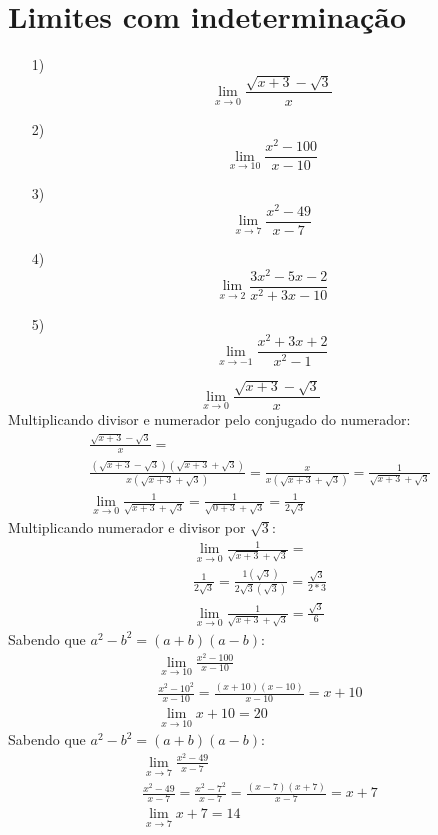 \documentclass{jhwhw}
\begin{document}
\chapter{Limites com indeterminação}
\begin{enumerate}
    \item [1)] \[
              \lim_{x \to 0} \frac{\sqrt{x+3}-\sqrt{3}}{x}
          \]
    \item [2)] \[
              \lim_{x \to 10} \frac{x^2-100}{x-10}
          \]
    \item [3)] \[
              \lim_{x \to 7} \frac{x^2-49}{x-7}
          \]
    \item [4)] \[
              \lim_{x \to 2} \frac{3x^2-5x-2}{x^2+3x-10}
          \]
    \item [5)] \[
              \lim_{x \to -1} \frac{x^2+3x+2}{x^2-1}
          \]
\end{enumerate}
\newpage
{}
$$\lim_{x \to 0} \frac{\sqrt{x+3}-\sqrt{3}}{x}$$
Multiplicando divisor e numerador pelo conjugado do numerador:
\begin{multline*}
    \frac{\sqrt{x+3}-\sqrt{3}}{x} =\\ \frac{(\sqrt{x+3}-\sqrt{3})(\sqrt{x+3}+\sqrt{3})}{x(\sqrt{x+3}+\sqrt{3})} = 
    \frac{x}{x(\sqrt{x+3}+\sqrt{3})} = 
    \frac{1}{\sqrt{x+3}+\sqrt{3}} \\
    \boxed{\lim_{x \to 0} \frac{1}{\sqrt{x+3}+\sqrt{3}} = 
    \frac{1}{\sqrt{0+3}+\sqrt{3}} 
    =\frac{1}{2\sqrt{3}}}
\end{multline*}
Multiplicando numerador e divisor por $\sqrt{3}$:
\begin{multline*}
    \lim_{x \to 0} \frac{1}{\sqrt{x+3}+\sqrt{3}} =\\ 
    \frac{1}{2\sqrt{3}} = 
    \frac{1(\sqrt{3})}{2\sqrt{3}(\sqrt{3})} = 
    \frac{\sqrt{3}}{2*3} \\ 
    \boxed{\lim_{x \to 0} \frac{1}{\sqrt{x+3}+\sqrt{3}} = \frac{\sqrt{3}}{6}}
\end{multline*}
Sabendo que $a^2 - b^2 = (a+b)(a-b)$:
\begin{multline*}
    \lim_{x \to 10} \frac{x^2-100}{x-10} \\
    \frac{x^2-10^2}{x-10} = \frac{(x+10)(x-10)}{x-10} = x+10 \\
    \boxed{\lim_{x\to10} x+10 = 20}
\end{multline*}
Sabendo que $a^2 - b^2 = (a+b)(a-b)$:
\begin{multline*}
    \lim_{x \to 7} \frac{x^2-49}{x-7}\\
    \frac{x^2 - 49}{x-7} = \frac{x^2 - 7^2}{x-7} = \frac{(x-7)(x+7)}{x-7} = x+7\\
    \boxed{\lim_{x \to 7} x+7 = 14}
\end{multline*}
\end{document}
